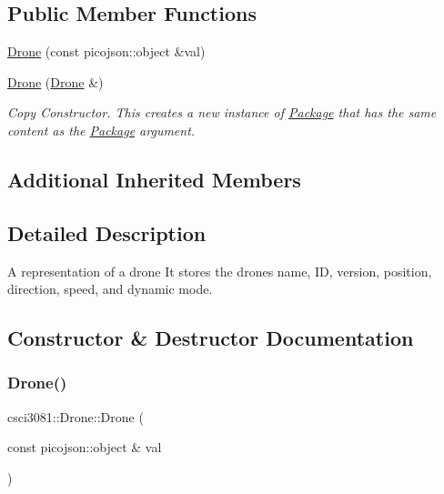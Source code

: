 \subsection*{Public Member Functions}
\begin{DoxyCompactItemize}
\item 
\hyperlink{classcsci3081_1_1Drone_ae6875af07d7f09ce59e2e2a62e5bd7d8}{Drone} (const picojson\+::object \&val)
\item 
\hyperlink{classcsci3081_1_1Drone_a2b97ed6144b5d97790e0950fa62d936f}{Drone} (\hyperlink{classcsci3081_1_1Drone}{Drone} \&)
\begin{DoxyCompactList}\small\item\em Copy Constructor. This creates a new instance of \hyperlink{classcsci3081_1_1Package}{Package} that has the same content as the \hyperlink{classcsci3081_1_1Package}{Package} argument. \end{DoxyCompactList}\end{DoxyCompactItemize}
\subsection*{Additional Inherited Members}


\subsection{Detailed Description}
A representation of a drone It stores the drone\textquotesingle{}s name, ID, version, position, direction, speed, and dynamic mode. 

\subsection{Constructor \& Destructor Documentation}
\mbox{\label{classcsci3081_1_1Drone_ae6875af07d7f09ce59e2e2a62e5bd7d8}} 
\subsubsection{\texorpdfstring{Drone()}{Drone()}\hspace{0.1cm}{\footnotesize\ttfamily [1/2]}}
{\footnotesize\ttfamily csci3081\+::\+Drone\+::\+Drone (\begin{DoxyParamCaption}\item[{const picojson\+::object \&}]{val }\end{DoxyParamCaption})}

